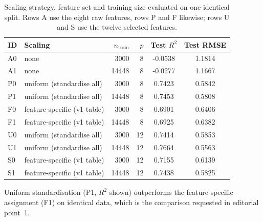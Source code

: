 \begin{table}[htbp]
\centering
\caption{Scaling strategy, feature set and training size evaluated on one identical split. Rows A use the eight raw features, rows P and F likewise; rows U and S use the twelve selected features.}\label{tab:configurations}
\small
\begin{tabular}{llrrcc}
\toprule
ID & Scaling & $n_{\text{train}}$ & $p$ & Test $R^2$ & Test RMSE \\
\midrule
A0 & none & 3000 & 8 & -0.0538 & 1.1814 \\
A1 & none & 14448 & 8 & -0.0277 & 1.1667 \\
P0 & uniform (standardise all) & 3000 & 8 & 0.7423 & 0.5842 \\
P1 & uniform (standardise all) & 14448 & 8 & 0.7453 & 0.5808 \\
F0 & feature-specific (v1 table) & 3000 & 8 & 0.6901 & 0.6406 \\
F1 & feature-specific (v1 table) & 14448 & 8 & 0.6925 & 0.6382 \\
U0 & uniform (standardise all) & 3000 & 12 & 0.7414 & 0.5853 \\
U1 & uniform (standardise all) & 14448 & 12 & 0.7664 & 0.5563 \\
S0 & feature-specific (v1 table) & 3000 & 12 & 0.7155 & 0.6139 \\
S1 & feature-specific (v1 table) & 14448 & 12 & 0.7438 & 0.5825 \\
\bottomrule
\end{tabular}
\begin{flushleft}\footnotesize Uniform standardisation (P1, $R^2$ shown) outperforms the feature-specific assignment (F1) on identical data, which is the comparison requested in editorial point~1.\end{flushleft}
\end{table}